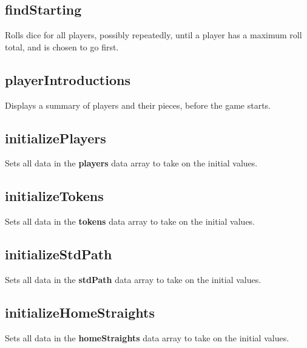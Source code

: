 \documentclass{article}
\begin{document}
\subsection{findStarting}
Rolls dice for all players, possibly repeatedly, until a player has a maximum roll total, and is chosen to go first.

\subsection{playerIntroductions}
Displays a summary of players and their pieces, before the game starts.

\subsection{initializePlayers}
Sets all data in the \textbf{players} data array to take on the initial values.

\subsection{initializeTokens}
Sets all data in the \textbf{tokens} data array to take on the initial values.

\subsection{initializeStdPath}
Sets all data in the \textbf{stdPath} data array to take on the initial values.

\subsection{initializeHomeStraights}
Sets all data in the \textbf{homeStraights} data array to take on the initial values.
\end{document}
